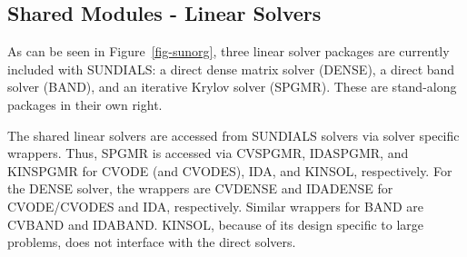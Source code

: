\subsection{Shared Modules - Linear Solvers}

As can be seen in \mbox{Figure \ref{fig-sunorg}}, three linear solver
packages are currently included with SUNDIALS: a direct dense matrix solver
(DENSE), a direct band solver (BAND), and an iterative Krylov solver
(SPGMR). These are stand-along packages in their own right.

The shared linear solvers are accessed from SUNDIALS solvers via solver
specific wrappers. Thus, SPGMR is accessed via CVSPGMR, IDASPGMR, and
KINSPGMR for CVODE (and CVODES), IDA, and KINSOL, respectively. For the
DENSE solver, the wrappers are CVDENSE and IDADENSE for CVODE/CVODES and
IDA, respectively. Similar wrappers for BAND are CVBAND and IDABAND. KINSOL,
because of its design specific to large problems, does not interface with
the direct solvers.
